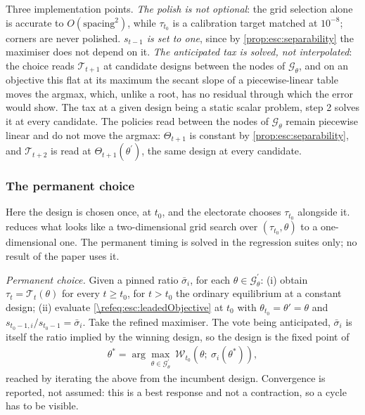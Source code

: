 Three implementation points. \emph{The polish is not optional}: the grid selection alone is accurate to $O(\text{spacing}^2)$, while $\tau_{t_0}$ is a calibration target matched at $10^{-8}$; corners are never polished. \emph{$s_{t-1}$ is set to one}, since by \cref{prop:esc:separability} the maximiser does not depend on it. \emph{The anticipated tax is solved, not interpolated}: the choice reads $\mathcal{T}_{t+1}$ at candidate designs between the nodes of $\mathcal{G}_{\theta}$, and on an objective this flat at its maximum the secant slope of a piecewise-linear table moves the argmax, which, unlike a root, has no residual through which the error would show. The tax at a given design being a static scalar problem, step 2 solves it at every candidate. The policies read between the nodes of $\mathcal{G}_{\theta}$ remain piecewise linear and do not move the argmax: $\Theta_{t+1}$ is constant by \cref{prop:esc:separability}, and $\mathcal{T}_{t+2}$ is read at $\Theta_{t+1}(\theta^{\prime})$, the same design at every candidate.


\subsubsection{The permanent choice}\label{\refsec:ESC:permanent}
Here the design is chosen once, at $t_0$, and the electorate chooses $\tau_{t_0}$ alongside it.  reduces what looks like a two-dimensional grid search over $\left(\tau_{t_0},\theta\right)$ to a one-dimensional one. The permanent timing is solved in the regression suites only; no result of the paper uses it.

\begin{alg}\label{\refalg:esc:permanent}
\emph{Permanent choice.} Given a pinned ratio $\bar{\sigma}_i$, for each $\theta\in\mathcal{G}_{\theta}^{\prime}$: (i) obtain $\tau_t = \mathcal{T}_t(\theta)$ for every $t\geq t_0$, for $t>t_0$ the ordinary equilibrium at a constant design; (ii) evaluate \eqref{\refeq:esc:leadedObjective} at $t_0$ with $\theta_{t_0}=\theta'=\theta$ and $s_{t_0-1,i}/s_{t_0-1}=\bar{\sigma}_i$. Take the refined maximiser. The vote being anticipated, $\bar{\sigma}_i$ is itself the ratio implied by the winning design, so the design is the fixed point of
\begin{align}\label{\refeq:esc:permFixedPoint}
    \theta^{\ast} = \arg\max_{\theta\in\mathcal{G}_{\theta}^{\prime}}\ \mathcal{W}_{t_0}\left(\theta;\ \sigma_i(\theta^{\ast})\right),
\end{align}
reached by iterating the above from the incumbent design. Convergence is reported, not assumed: this is a best response and not a contraction, so a cycle has to be visible.
\end{alg}

